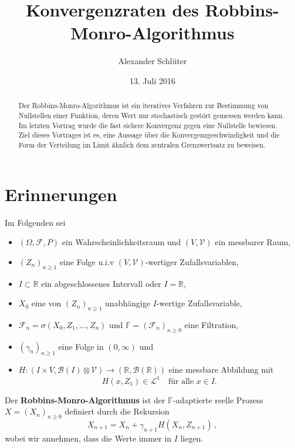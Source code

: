 \documentclass[ngerman,a4paper,11pt]{scrartcl}
\newcommand{\FF}{\mathbb{F}}
\newcommand{\RR}{\mathbb{R}}
\newcommand{\bb}{\mathcal{B}}
\newcommand{\ff}{\mathcal{F}}
\renewcommand{\ll}{\mathcal{L}}
\newcommand{\vv}{\mathcal{V}}
\newcommand{\zspace}{V}
\newcommand{\zsigma}{\vv}
\begin{document}
\title{Konvergenzraten des Robbins-Monro-Algorithmus}
\author{Alexander Schlüter}
\date{13. Juli 2016}
\maketitle
\begin{abstract}
  Der Robbins-Monro-Algorithmus ist ein iteratives Verfahren zur Bestimmung von
  Nullstellen einer Funktion, deren Wert nur stochastisch gestört gemessen
  werden kann. Im letzten Vortrag wurde die fast sichere Konvergenz gegen eine
  Nullstelle bewiesen. Ziel dieses Vortrages ist es, eine Aussage über die
  Konvergenzgeschwindigkeit und die Form der Verteilung im Limit ähnlich dem
  zentralen Grenzwertsatz zu beweisen.
\end{abstract}
\tableofcontents

\section{Erinnerungen}
Im Folgenden sei    
\begin{itemize}
\item $(\Omega, \ff, P)$ ein Wahrscheinlichkeitsraum und $(\zspace,\zsigma)$ ein messbarer Raum,
\item $(Z_n)_{n\geq 1}$ eine Folge u.i.v $(\zspace, \zsigma)$-wertiger Zufallsvariablen,
\item $I\subset\RR$ ein abgeschlossenes Intervall oder $I=\RR$, 
\item $X_0$ eine von $(Z_n)_{n\geq 1}$ unabhängige $I$-wertige Zufallsvariable,
\item $\ff_n=\sigma(X_0,Z_1,\dotsc,Z_n)$ und $\FF=(\ff_n)_{n\geq 0}$ eine Filtration,
\item $(\gamma_n)_{n\geq 1}$ eine Folge in $(0,\infty)$ und
\item $H:(I\times \zspace,\bb(I)\otimes\zsigma)\to(\RR,\bb(\RR))$ eine messbare
  Abbildung mit
  \begin{equation*}
    H(x,Z_1)\in\ll^1\quad\text{für alle $x\in I$.}
  \end{equation*}
\end{itemize}

Der \textbf{Robbins-Monro-Algorithmus} ist der $\FF$-adaptierte reelle Prozess
$X=(X_n)_{n\geq 0}$ definiert durch die Rekursion
\begin{equation}
  \label{eq:algo}
  X_{n+1}=X_n+\gamma_{n+1}H(X_n,Z_{n+1})\,,
\end{equation}
wobei wir annehmen, dass die Werte immer in $I$ liegen.
\end{document}
